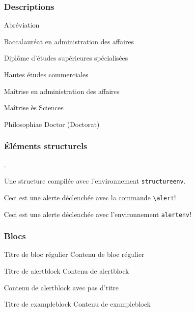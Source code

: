 \documentclass[aspectratio=1610,compress,t,english,french]{hecppt}
\begin{document}
\begin{frame}
\frametitle{Descriptions}

	\begin{description}[ABBR]
		\item[ABBR] Abréviation
		\item[BAA] Baccalauréat en administration des affaires
		\item[DESS] Diplôme d'études supérieures spécialisées
		\item[HEC] Hautes études commerciales
		\item[MBA] Maîtrise en administration des affaires
		\item[MSc] Maîtrise ès Sciences
		\item[PhD] Philosophiae Doctor (Doctorat)
	\end{description}
\end{frame}

\begin{frame}[c]
\frametitle{Éléments structurels}
	.
	
	\begin{structureenv}
		Une structure compilée avec l'environnement \texttt{structureenv}.
	\end{structureenv}

	\alert{Ceci est une alerte déclenchée avec la commande \texttt{\textbackslash alert}!}
	
	\begin{alertenv}
		Ceci est une alerte déclenchée avec l'environnement \texttt{alertenv}!
	\end{alertenv}
\end{frame}

\begin{frame}[c]
\frametitle{Blocs}

	\begin{block}{Titre de bloc régulier}
		Contenu de bloc régulier
	\end{block}

	\begin{alertblock}{Titre de alertblock}
		Contenu de alertblock
	\end{alertblock}

	\begin{alertblock}{}
		Contenu de alertblock avec pas d'titre
	\end{alertblock}

	\begin{exampleblock}{Titre de exampleblock}
		Contenu de exampleblock
	\end{exampleblock}
	
\end{frame}
\end{document}
